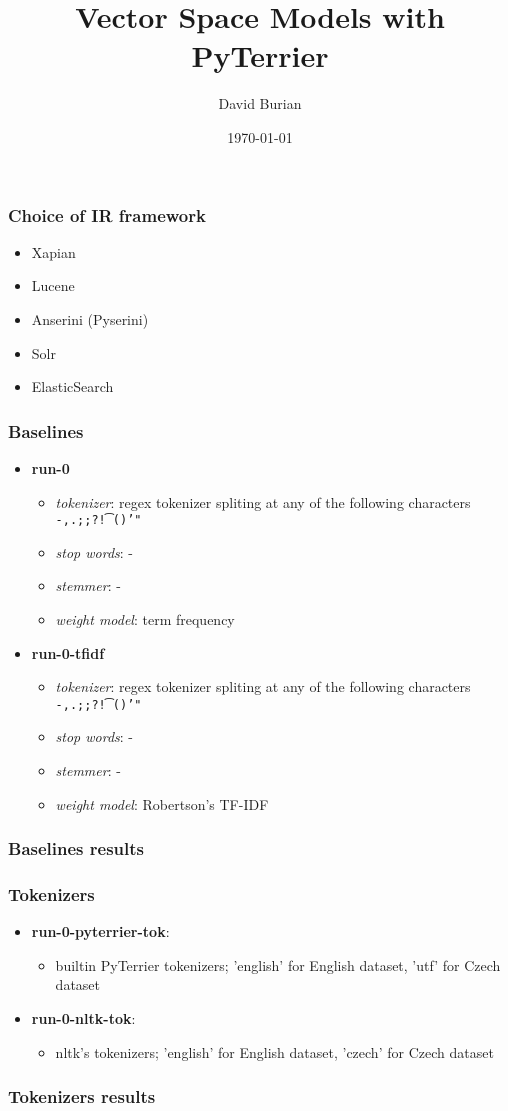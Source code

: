 \documentclass{beamer}
\title{Vector Space Models with PyTerrier}
\author{David Burian}
\date{\today}
\newcommand{\RunName}[1]{\textbf{#1}}
\let\Oldinput
\renewcommand{}[1]{\resizebox{\textwidth}{!}{\Oldinput{#1}}}
\newcommand{\Run}[5]{
  \RunName{#1}

  \begin{itemize}
      \item \emph{tokenizer}: #2
      \item \emph{stop words}: #3
      \item \emph{stemmer}: #4
      \item \emph{weight model}: #5
  \end{itemize}
}
\newcommand{\RunShort}[2]{
  \RunName{#1}:
  \begin{itemize}
    \item #2
  \end{itemize}
}
\newcommand{\RunResults}[2]{%
\begin{table}[h]
\centering

    \caption{Results of #2.\label{tbl:#1}}
\end{table}
}
\begin{document}
\frame{\titlepage}

\begin{frame}
  \frametitle{Choice of IR framework}
  \begin{itemize}
    \item Xapian
    \item Lucene
    \item Anserini (Pyserini)
    \item Solr
    \item ElasticSearch
  \end{itemize}
\end{frame}

\begin{frame}
  \frametitle{Baselines}
  \begin{itemize}
    \item \Run{run-0}{
    regex tokenizer spliting at any of the following characters
    \texttt{-,.;;?!\textvisiblespace\string\t\string\n\string[\string]\string(\string)'"}
}{-}{-}{term frequency}

\item \Run{run-0-tfidf}{
    regex tokenizer spliting at any of the following characters
    \texttt{-,.;;?!\textvisiblespace\string\t\string\n\string[\string]\string(\string)'"}
}{-}{-}{Robertson's TF-IDF}
  \end{itemize}
\end{frame}

\begin{frame}
  \frametitle{Baselines results}

\RunResults{baselines}{\RunName{run-0} and \RunName{run-0-tfidf}}
\end{frame}

\begin{frame}
  \frametitle{Tokenizers}
  \begin{itemize}
    \item \RunShort{run-0-pyterrier-tok}{
    builtin PyTerrier tokenizers; 'english' for English dataset, 'utf' for Czech dataset
}

    \item \RunShort{run-0-nltk-tok}{
    nltk's tokenizers; 'english' for English dataset, 'czech' for Czech dataset}
  \end{itemize}
\end{frame}

\begin{frame}
  \frametitle{Tokenizers results}
\RunResults{tokenizers}{\RunName{run-0-pyterrier-tok} and \RunName{run-0-nltk-tok}}
\end{frame}
\end{document}
